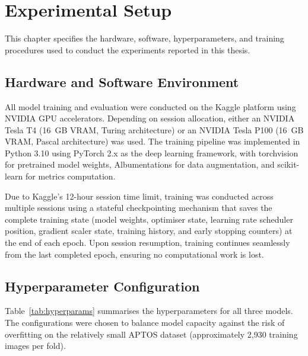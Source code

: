 \chapter{Experimental Setup}
\label{ch:experimental}

This chapter specifies the hardware, software, hyperparameters, and training procedures used to conduct the experiments reported in this thesis.

\section{Hardware and Software Environment}
\label{sec:hardware}

All model training and evaluation were conducted on the Kaggle platform using NVIDIA GPU accelerators. Depending on session allocation, either an NVIDIA Tesla T4 (16~GB VRAM, Turing architecture) or an NVIDIA Tesla P100 (16~GB VRAM, Pascal architecture) was used. The training pipeline was implemented in Python 3.10 using PyTorch 2.x as the deep learning framework, with torchvision for pretrained model weights, Albumentations \cite{buslaev2020albumentations} for data augmentation, and scikit-learn for metrics computation.

Due to Kaggle's 12-hour session time limit, training was conducted across multiple sessions using a stateful checkpointing mechanism that saves the complete training state (model weights, optimiser state, learning rate scheduler position, gradient scaler state, training history, and early stopping counters) at the end of each epoch. Upon session resumption, training continues seamlessly from the last completed epoch, ensuring no computational work is lost.

\section{Hyperparameter Configuration}
\label{sec:hyperparameters}

Table~\ref{tab:hyperparams} summarises the hyperparameters for all three models. The configurations were chosen to balance model capacity against the risk of overfitting on the relatively small APTOS dataset (approximately 2,930 training images per fold).

